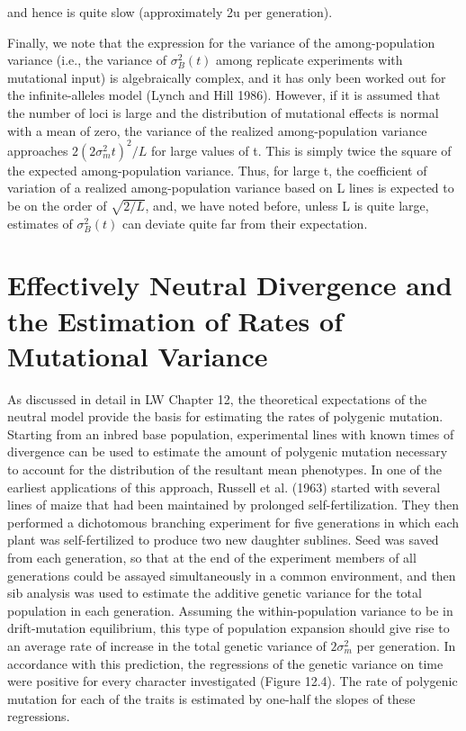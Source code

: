 \documentclass{article}
\begin{document}
and hence is quite slow (approximately 2u per generation).

Finally, we note that the expression for the variance of the among-population variance (i.e., the variance of  $ \sigma_{B}^{2}(t) $ among replicate experiments with mutational input) is algebraically complex, and it has only been worked out for the infinite-alleles model (Lynch and Hill 1986). However, if it is assumed that the number of loci is large and the distribution of mutational effects is normal with a mean of zero, the variance of the realized among-population variance approaches  $ 2(2\sigma_{m}^{2}t)^{2}/L $ for large values of t. This is simply twice the square of the expected among-population variance. Thus, for large t, the coefficient of variation of a realized among-population variance based on L lines is expected to be on the order of  $ \sqrt{2/L} $, and, we have noted before, unless L is quite large, estimates of  $ \sigma_{B}^{2}(t) $ can deviate quite far from their expectation.

\section{Effectively Neutral Divergence and the Estimation of Rates of Mutational Variance}
As discussed in detail in LW Chapter 12, the theoretical expectations of the neutral model provide the basis for estimating the rates of polygenic mutation. Starting from an inbred base population, experimental lines with known times of divergence can be used to estimate the amount of polygenic mutation necessary to account for the distribution of the resultant mean phenotypes. In one of the earliest applications of this approach, Russell et al. (1963) started with several lines of maize that had been maintained by prolonged self-fertilization. They then performed a dichotomous branching experiment for five generations in which each plant was self-fertilized to produce two new daughter sublines. Seed was saved from each generation, so that at the end of the experiment members of all generations could be assayed simultaneously in a common environment, and then sib analysis was used to estimate the additive genetic variance for the total population in each generation. Assuming the within-population variance to be in drift-mutation equilibrium, this type of population expansion should give rise to an average rate of increase in the total genetic variance of  $ 2\sigma_{m}^{2} $ per generation. In accordance with this prediction, the regressions of the genetic variance on time were positive for every character investigated (Figure 12.4). The rate of polygenic mutation for each of the traits is estimated by one-half the slopes of these regressions.
\end{document}
